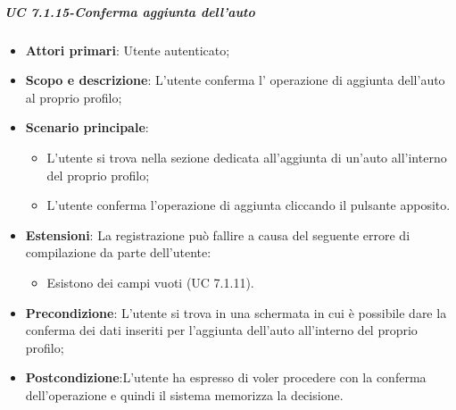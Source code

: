          \subparagraph{UC 7.1.15-Conferma aggiunta dell'auto}
            \begin{itemize}
                \item \textbf{Attori primari}: Utente autenticato;
                
                \item \textbf{Scopo e descrizione}: L'utente conferma l' operazione di aggiunta dell'auto al proprio profilo; 
                \item \textbf{Scenario principale}:
                    \begin{itemize}
                        \item L'utente si trova nella sezione dedicata all'aggiunta di un'auto all'interno del proprio profilo;
                        \item L'utente conferma l'operazione di aggiunta cliccando il pulsante apposito.
                    \end{itemize}
                \item \textbf{Estensioni}: La registrazione può fallire a causa del seguente errore di compilazione da parte dell'utente:
                \begin{itemize}
                \item Esistono dei campi vuoti (UC 7.1.11).
                \end{itemize}
                \item \textbf{Precondizione}: L'utente si trova in una schermata in cui è possibile dare la conferma
                dei dati inseriti per l'aggiunta dell'auto all'interno del proprio profilo;
                \item \textbf{Postcondizione}:L’utente ha espresso di voler procedere con la conferma dell'operazione e quindi il sistema memorizza la decisione.
            \end{itemize}
                        
                 
                 
